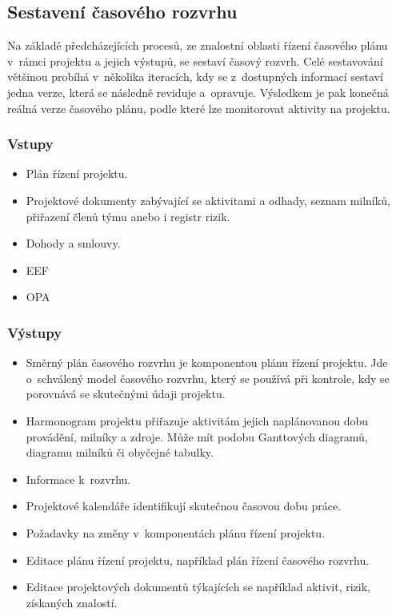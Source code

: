 \subsection*{Sestavení časového rozvrhu}

Na základě předcházejících procesů, ze znalostní oblasti řízení časového plánu v~rámci projektu a jejich výstupů, se sestaví časový rozvrh. Celé sestavování většinou probíhá v~několika iteracích, kdy se z~dostupných informací sestaví jedna verze, která se následně reviduje a~opravuje. Výsledkem je pak konečná reálná verze časového plánu, podle které lze monitorovat aktivity na projektu.

\subsubsection*{Vstupy}
\begin{itemize}
    \item Plán řízení projektu.
    \item Projektové dokumenty zabývající se aktivitami a odhady, seznam milníků, přiřazení členů týmu anebo i registr rizik.
    \item Dohody a smlouvy.
    \item EEF
    \item OPA
\end{itemize}
\subsubsection*{Výstupy}
\begin{itemize}
    \item Směrný plán časového rozvrhu je komponentou plánu řízení projektu. Jde o~schválený model časového rozvrhu, který se používá při kontrole, kdy se porovnává se skutečnými údaji projektu. 
    \item Harmonogram projektu přiřazuje aktivitám jejich naplánovanou dobu provádění, milníky a zdroje. Může mít podobu Ganttových diagramů, diagramu milníků či obyčejné tabulky.
    \item Informace k~rozvrhu.
    \item Projektové kalendáře identifikují skutečnou časovou dobu práce.
    \item Požadavky na změny v~komponentách plánu řízení projektu.
    \item Editace plánu řízení projektu, například plán řízení časového rozvrhu.
    \item Editace projektových dokumentů týkajících se například aktivit, rizik, získaných znalostí.
\end{itemize}


